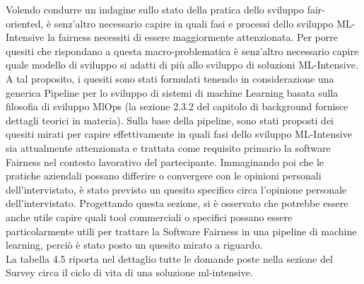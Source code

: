    Volendo condurre un indagine sullo stato della pratica dello sviluppo fair-oriented, è senz'altro necessario capire in quali fasi e processi dello sviluppo ML-Intensive la fairness necessiti di essere maggiormente attenzionata. Per porre quesiti che rispondano a questa macro-problematica è senz'altro necessario capire quale modello di sviluppo si adatti di più allo sviluppo di soluzioni ML-Intensive. A tal proposito, i quesiti sono stati formulati tenendo in considerazione una generica Pipeline per lo sviluppo di sistemi di machine Learning basata sulla filosofia di sviluppo MlOps (la sezione 2.3.2 del capitolo di background fornisce dettagli teorici in materia). Sulla base della pipeline, sono stati proposti dei quesiti mirati per capire effettivamente in quali fasi dello sviluppo ML-Intensive sia attualmente attenzionata e trattata come requisito primario la software Fairness nel contesto lavorativo del partecipante. Immaginando poi che le pratiche aziendali possano differire o convergere con le opinioni personali dell'intervistato, è stato previsto un quesito specifico circa l'opinione personale dell'intervistato. Progettando questa sezione, si è osservato che potrebbe essere anche utile capire quali tool commerciali o specifici possano essere particolarmente utili per trattare la Software Fairness in una pipeline di machine learning, perciò è stato posto un quesito mirato a riguardo. \\
   
   La tabella 4.5 riporta nel dettaglio tutte le domande poste nella sezione del Survey circa il ciclo di vita di una soluzione ml-intensive.
   
